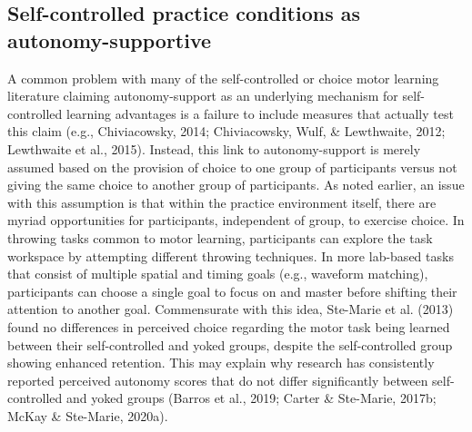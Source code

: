 \documentclass[
  english,
  man, donotrepeattitle,floatsintext]{apa7}
\begin{document}
\hypertarget{self-controlled-practice-conditions-as-autonomy-supportive}{%
\subsection{Self-controlled practice conditions as autonomy-supportive}\label{self-controlled-practice-conditions-as-autonomy-supportive}}

A common problem with many of the self-controlled or choice motor learning literature claiming autonomy-support as an underlying mechanism for self-controlled learning advantages is a failure to include measures that actually test this claim (e.g., Chiviacowsky, 2014; Chiviacowsky, Wulf, \& Lewthwaite, 2012; Lewthwaite et al., 2015). Instead, this link to autonomy-support is merely assumed based on the provision of choice to one group of participants versus not giving the same choice to another group of participants. As noted earlier, an issue with this assumption is that within the practice environment itself, there are myriad opportunities for participants, independent of group, to exercise choice. In throwing tasks common to motor learning, participants can explore the task workspace by attempting different throwing techniques. In more lab-based tasks that consist of multiple spatial and timing goals (e.g., waveform matching), participants can choose a single goal to focus on and master before shifting their attention to another goal. Commensurate with this idea, Ste-Marie et al. (2013) found no differences in perceived choice regarding the motor task being learned between their self-controlled and yoked groups, despite the self-controlled group showing enhanced retention. This may explain why research has consistently reported perceived autonomy scores that do not differ significantly between self-controlled and yoked groups (Barros et al., 2019; Carter \& Ste-Marie, 2017b; McKay \& Ste-Marie, 2020a).
\end{document}
